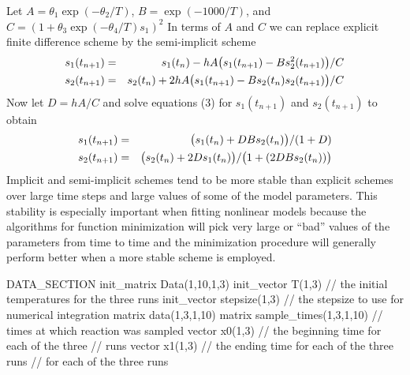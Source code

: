 \documentclass[12pt]{book}
\begin{document}
Let $A=\theta_1\exp(-\theta_2/T)$, $B=\exp(-1000/T)$, and  
$C=(1+\theta_3\exp(-\theta_4/T)s_1)^2$
In terms of $A$ and $C$ we can replace  explicit finite difference 
scheme by the semi-implicit scheme
 \begin{eqnarray}
   s_1(t_{n+1})&=&
    s_1(t_n)-hA\big(s_1(t_{n+1})-B  s_2^2(t_{n+1})\big)/C \cr
           s_2(t_{n+1})&=&
   s_2(t_n)+2hA\big(s_1(t_{n+1})-Bs_2(t_n) s_2(t_{n+1})\big)/C\cr
 \end{eqnarray}
Now let $D=hA/C$ and solve equations (3) for 
$s_1(t_{n+1})$ and $s_2(t_{n+1})$ to obtain
 \begin{eqnarray}
s_1(t_{n+1})&=&\big(s_1(t_n)+DB s_2(t_n)\big)/(1+D) \cr
           s_2(t_{n+1})&=&\big(s_2(t_n)+2Ds_1(t_n)\big)/
             \big(1+(2DBs_2(t_n))\big)\cr
 \end{eqnarray}
Implicit and semi-implicit schemes tend to be more stable than
explicit schemes over large time steps and large values of some of the
model parameters. This stability is especially important when
fitting nonlinear models because the algorithms for function
minimization will pick very large or ``bad'' values of the
parameters from time to time and the minimization procedure will
generally perform better when a more stable scheme is employed.

\beginexample
DATA_SECTION
  init_matrix Data(1,10,1,3)  
  init_vector T(1,3) // the initial temperatures for the three runs
  init_vector stepsize(1,3)  // the stepsize to use for numerical integration
  matrix data(1,3,1,10)
  matrix sample_times(1,3,1,10) // times at which reaction was sampled
  vector x0(1,3)           // the beginning time for each of the three
                           // runs
  vector x1(1,3)           // the ending time for each of the three runs
  // for each of the three runs
\end{document}
